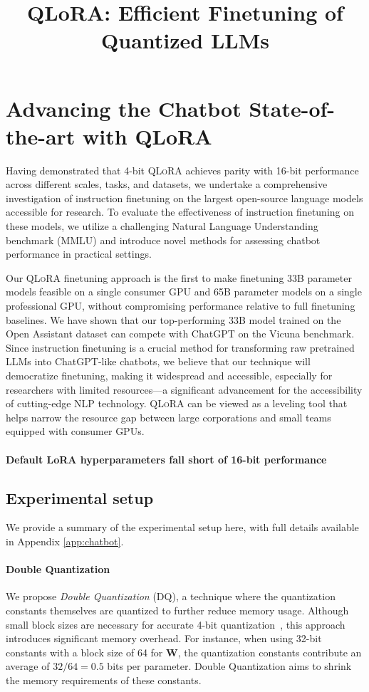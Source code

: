 \title{QLoRA: Efficient Finetuning of Quantized LLMs}
\section{Advancing the Chatbot State-of-the-art with QLoRA}
\label{sec:pushing}
Having demonstrated that 4-bit \textsc{QLoRA} achieves parity with 16-bit performance across different scales, tasks, and datasets, we undertake a comprehensive investigation of instruction finetuning on the largest open-source language models accessible for research. To evaluate the effectiveness of instruction finetuning on these models, we utilize a challenging Natural Language Understanding benchmark (MMLU) and introduce novel methods for assessing chatbot performance in practical settings.

Our \textsc{QLoRA} finetuning approach is the first to make finetuning 33B parameter models feasible on a single consumer GPU and 65B parameter models on a single professional GPU, without compromising performance relative to full finetuning baselines. We have shown that our top-performing 33B model trained on the Open Assistant dataset can compete with ChatGPT on the Vicuna benchmark. Since instruction finetuning is a crucial method for transforming raw pretrained LLMs into ChatGPT-like chatbots, we believe that our technique will democratize finetuning, making it widespread and accessible, especially for researchers with limited resources—a significant advancement for the accessibility of cutting-edge NLP technology. \textsc{QLoRA} can be viewed as a leveling tool that helps narrow the resource gap between large corporations and small teams equipped with consumer GPUs.

\paragraph{Default LoRA hyperparameters fall short of 16-bit performance}

\subsection{Experimental setup} We provide a summary of the experimental setup here, with full details available in Appendix \ref{app:chatbot}. 

\paragraph{Double Quantization{}} 
We propose \emph{Double Quantization} (DQ), a technique where the quantization constants themselves are quantized to further reduce memory usage. Although small block sizes are necessary for accurate 4-bit quantization~\citep{dettmers2022case}, this approach introduces significant memory overhead. For instance, when using 32-bit constants with a block size of 64 for $\mathbf{W}$, the quantization constants contribute an average of $32/64 = 0.5$ bits per parameter. Double Quantization aims to shrink the memory requirements of these constants.

